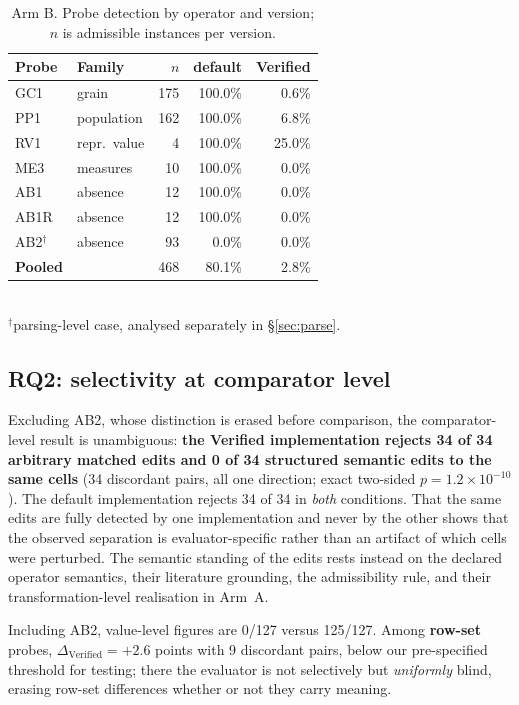 \documentclass[10pt,conference]{IEEEtran}
\begin{document}
\begin{table}[t]
\caption{Arm B. Probe detection by operator and version; $n$ is admissible
instances per version.}
\label{tab:main}
\centering\footnotesize
\begin{tabular}{@{}llrrr@{}}
\toprule
\textbf{Probe} & \textbf{Family} & \textbf{$n$} & \textbf{default} & \textbf{Verified} \\
\midrule
GC1  & grain          & 175 & 100.0\% & 0.6\% \\
PP1  & population     & 162 & 100.0\% & 6.8\% \\
RV1  & repr.\ value   & 4   & 100.0\% & 25.0\% \\
ME3  & measures       & 10  & 100.0\% & 0.0\% \\
AB1  & absence        & 12  & 100.0\% & 0.0\% \\
AB1R & absence        & 12  & 100.0\% & 0.0\% \\
AB2$^\dagger$ & absence & 93 & 0.0\% & 0.0\% \\
\midrule
\textbf{Pooled} & & 468 & 80.1\% & 2.8\% \\
\bottomrule
\end{tabular}
\\[2pt]
\footnotesize$^\dagger$parsing-level case, analysed separately in \S\ref{sec:parse}.
\end{table}

\subsection{RQ2: selectivity at comparator level}

Excluding AB2, whose distinction is erased before comparison, the comparator-level
result is unambiguous: \textbf{the Verified implementation rejects 34 of 34
arbitrary matched edits and 0 of 34 structured semantic edits to the same cells}
(34 discordant pairs, all one direction; exact two-sided
$p=1.2\times10^{-10}$). The default implementation rejects 34 of 34 in
\emph{both} conditions. That the same edits are fully detected by one
implementation and never by the other shows that the observed separation is
evaluator-specific rather than an artifact of which cells were perturbed. The
semantic standing of the edits rests instead on the declared operator semantics,
their literature grounding, the admissibility rule, and their transformation-level
realisation in Arm~A.

Including AB2, value-level figures are 0/127 versus 125/127. Among \textbf{row-set}
probes, $\Delta_{\text{Verified}}=+2.6$ points with 9 discordant pairs, below our
pre-specified threshold for testing; there the evaluator is not selectively but
\emph{uniformly} blind, erasing row-set differences whether or not they carry
meaning.
\end{document}
